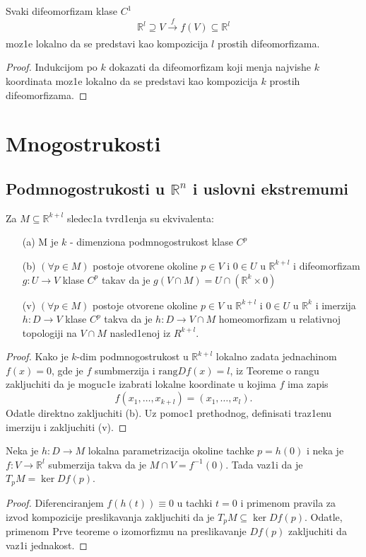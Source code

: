 \documentclass[a4paper,12pt]{article}
\newcommand{\R}{\mathbb{R}}
\newcommand{\psj}{\subseteq}
\newcommand{\rang}{\mathrm{rang}}
\begin{document}
\begin{tvr}
Svaki difeomorfizam klase $C^1$ 
\[\R^l \supseteq V \xrightarrow[]{f} f(V) \subseteq \R^l \]
moz1e lokalno da se predstavi kao kompozicija $l$ prostih difeomorfizama. 
\end{tvr}
\begin{proof}
Indukcijom po $k$ dokazati da difeomorfizam koji menja najvishe $k$ koordinata moz1e lokalno da se predstavi kao kompozicija $k$ prostih difeomorfizama.
\end{proof}

\section{Mnogostrukosti}

\subsection{Podmnogostrukosti u $\R^n$ i uslovni ekstremumi}

\begin{tvr}
Za $M \psj \R^{k+l}$ sledec1a tvrd1enja su ekvivalenta:
\begin{itemize}
\item[(a)] M je $k$ - dimenziona podmnogostrukost klase $C^p$
\item[(b)] $(\forall p \in M)$ postoje otvorene okoline $p \in V$ i $0 \in U$ u $\R^{k+l}$ i difeomorfizam $g: U \to V$ klase $C^p$ takav da je $g(V \cap M) = U \cap (\R^k \times {0})$
\item[(v)] $(\forall p \in M)$ postoje otvorene okoline $p \in V$  u $\R^{k+l}$ i $0 \in U$ u $\R^k$ i imerzija $h: D \to V$ klase $C^p$ takva da je $h: D \to V \cap M$ homeomorfizam u relativnoj topologiji na $V \cap M$ nasled1enoj iz $R^{k+l}$.
\end{itemize}
\end{tvr}
\begin{proof}
Kako je $k$-dim podmnogostrukost u $\R^{k+l}$ lokalno zadata jednachinom $f(x) = 0$, gde je $f$ sumbmerzija i $\rang Df(x) = l$, iz Teoreme o rangu zakljuchiti da je moguc1e izabrati lokalne koordinate u kojima $f$ ima zapis 
\[ f(x_1, \dots , x_{k+l}) = (x_1, \dots, x_l). \] Odatle direktno zakljuchiti (b). Uz pomoc1 prethodnog, definisati traz1enu imerziju i zakljuchiti (v).
\end{proof}

\begin{tvr}
Neka je $h:D \to M$ lokalna parametrizacija okoline tachke $p = h(0)$ i neka je $f: V \to \R^l$ submerzija takva da je $M \cap V = f^{-1} (0)$. Tada vaz1i da je $T_p M = \ker D f(p)$.
\end{tvr}
\begin{proof}
Diferenciranjem $f(h(t)) \equiv 0$ u tachki $t = 0$ i primenom pravila za izvod kom\-po\-zi\-ci\-je preslikavanja zakljuchiti da je $T_p M \psj \ker Df(p)$. Odatle, primenom Prve teoreme o i\-zo\-mor\-fi\-zmu na preslikavanje $Df(p)$ zakljuchiti da vaz1i jednakost.
\end{proof}
\end{document}

